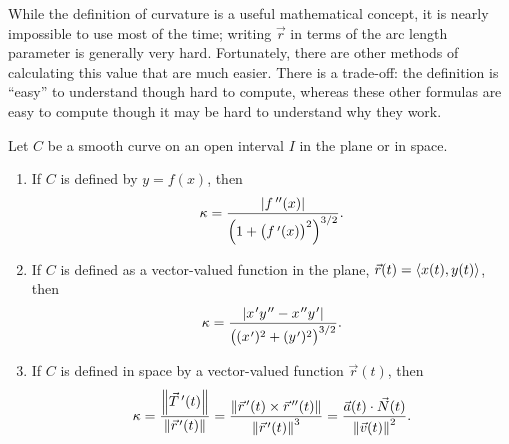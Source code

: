 While the definition of curvature is a useful mathematical concept, it is nearly impossible to use most of the time; writing $\vec r$ in terms of the arc length parameter is generally very hard. Fortunately, there are other methods of calculating this value that are much easier. There is a trade-off: the definition is ``easy\primeskip'' to understand though hard to compute, whereas these other formulas are easy to compute though it may be hard to understand why they work.

\begin{theorem}\label{thm:curvature_formulas}%
Let $C$ be a smooth curve on an open interval $I$ in the plane or in space.
\begin{enumerate}
	\item If $C$ is defined by $y=f(x)$, then 
	\[\kappa = \frac{\left\lvert f\,''(x) \right\rvert}{\Bigl(1+\bigl(f\,'(x)\bigr)^2\Bigr)^{3/2}}.\]
	\item	If $C$ is defined as a vector-valued function in the plane, $\vec r(t) =\left\langle x(t), y(t)\right\rangle$, then
	\[\kappa = \frac{\abs{x\primeskip'y\primeskip''-x\primeskip''y\primeskip'}}{\bigl((x\primeskip')^2+(y\primeskip')^2\bigr)^{3/2}}.\]
	\item If $C$ is defined in space by a vector-valued function $\vec r(t)$, then
\[\kappa = \frac{\left\lVert \vec T\,'(t) \right\rVert}{\left\lVert \vec r\hskip1.25pt '(t) \right\rVert} = \frac{\left\lVert \vec r\hskip1.25pt '(t)\times\vec r\hskip1.25pt ''(t) \right\rVert}{\left\lVert \vec r\hskip1.25pt '(t) \right\rVert^3} = \frac{\vec a(t)\cdot \vec N(t)}{\left\lVert \vec v(t) \right\rVert^2}.\]
\end{enumerate}
\end{theorem}

